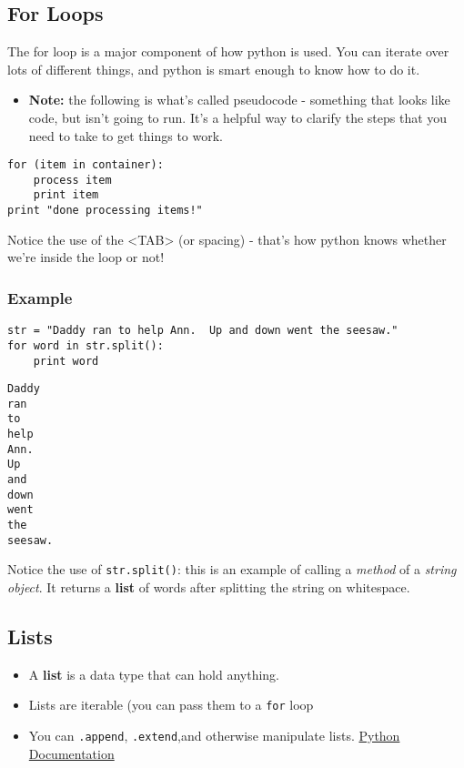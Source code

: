 \documentclass[11pt]{article}
\begin{document}
\subsection{For Loops}
\label{sec-2-4}

   The for loop is a major component of how python is used.  You can
   iterate over lots of different things, and python is smart enough
   to know how to do it.  
\begin{itemize}
\item \textbf{Note:} the following is what's called pseudocode - something
     that looks like code, but isn't going to run.  It's a helpful way
     to clarify the steps that you need to take to get things to
     work.
\end{itemize}

\begin{verbatim}
for (item in container):
    process item
    print item
print "done processing items!"
\end{verbatim}


   Notice the use of the <TAB> (or spacing) - that's how python knows whether we're
   inside the loop or not!
\subsubsection{Example}
\label{sec-2-4-1}


\begin{verbatim}
str = "Daddy ran to help Ann.  Up and down went the seesaw."      
for word in str.split():
    print word
\end{verbatim}


\begin{verbatim}
Daddy
ran
to
help
Ann.
Up
and
down
went
the
seesaw.
\end{verbatim}

    Notice the use of \texttt{str.split()}: this is an example of calling a
    \emph{method} of a \emph{string object}.  It returns a \textbf{list} of words after
    splitting the string on whitespace.
\subsection{Lists}
\label{sec-2-5}


\begin{itemize}
\item A \textbf{list} is a data type that can hold anything.
\item Lists are iterable (you can pass them to a \texttt{for} loop
\item You can \texttt{.append}, \texttt{.extend},and otherwise manipulate lists.  \href{http://docs.python.org/tutorial/datastructures.html}{Python Documentation}
\end{itemize}
\end{document}
